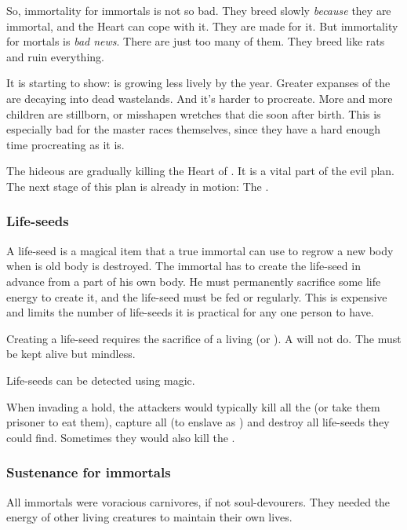 So, immortality for immortals is not so bad. 
They breed slowly \emph{because} they are immortal, and the Heart can cope with it. 
They are made for it. 
But immortality for mortals is \emph{bad news}. 
There are just too many of them.
They breed like rats and ruin everything. 

It is starting to show: 
\Miith{} is growing less lively by the year. 
Greater expanses of the \Wylde{} are decaying into dead wastelands. 
And it's harder to procreate. 
More and more children are stillborn, or misshapen wretches that die soon after birth. 
This is especially bad for the master races themselves, since they have a hard enough time procreating as it is. 

The hideous \sephiroth{} are gradually killing the Heart of \Miith{}. 
It is a vital part of the \psp{\banelords}{} evil plan. 
The next stage of this plan is already in motion: 
The . 





\subsubsection{Life-seeds}
A life-seed is a magical item that a true immortal can use to regrow a new body when is old body is destroyed. 
The immortal has to create the life-seed in advance from a part of his own body.
He must permanently sacrifice some life energy to create it, and the life-seed must be fed or  regularly.
This is expensive and limits the number of life-seeds it is practical for any one person to have. 

Creating a \resphan life-seed requires the sacrifice of a living \human (or \resphan). 
A \nephil will not do. 
The \human must be kept alive but mindless. 

Life-seeds can be detected using magic.

When invading a \resphan hold, the attackers would typically kill all the \resphain (or take them prisoner to eat them), capture all \resviel (to enslave as \yurideth) and destroy all life-seeds they could find.
Sometimes they would also kill the \humans.





\subsubsection{Sustenance for immortals}
All immortals were voracious carnivores, if not soul-devourers. 
They needed the energy of other living creatures to maintain their own lives. 





